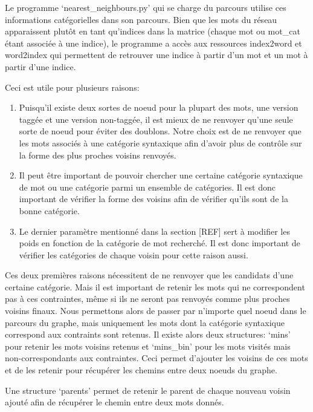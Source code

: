 Le programme \lq{nearest\_neighbours.py}\rq{} qui se charge du parcours utilise ces informations catégorielles dans son parcours. Bien que les mots du réseau apparaissent plutôt en tant qu'indices dans la matrice (chaque mot ou mot\_cat étant associée à une indice), le programme a accès aux ressources index2word et word2index qui permettent de retrouver une indice à partir d'un mot et un mot à partir d'une indice.

Ceci est utile pour plusieurs raisons:

\begin{enumerate}
    \item{Puisqu'il existe deux sortes de noeud pour la plupart des mots, une version taggée et une version non-taggée, il est mieux de ne renvoyer qu'une seule sorte de noeud pour éviter des doublons. Notre choix est de ne renvoyer que les mots associés à une catégorie syntaxique afin d'avoir plus de contrôle sur la forme des plus proches voisins renvoyés.}
    \item{Il peut être important de pouvoir chercher une certaine catégorie syntaxique de mot ou une catégorie parmi un ensemble de catégories. Il est donc important de vérifier la forme des voisins afin de vérifier qu'ils sont de la bonne catégorie.}
    \item{Le dernier paramètre mentionné dans la section [REF] sert à modifier les poids en fonction de la catégorie de mot recherché. Il est donc important de vérifier les catégories de chaque voisin pour cette raison aussi.}
\end{enumerate}

Ces deux premières raisons nécessitent de ne renvoyer que les candidats d'une certaine catégorie. Mais il est important de retenir les mots qui ne correspondent pas à ces contraintes, même si ils ne seront pas renvoyés comme plus proches voisins finaux. Nous permettons alors de passer par n'importe quel noeud dans le parcours du graphe, mais uniquement les mots dont la catégorie syntaxique correspond aux contraints sont retenus. Il existe alors deux structures: \lq{mins}\rq{} pour retenir les mots voisins retenus et \lq{mins\_bin}\rq{} pour les mots visités mais non-correspondants aux contraintes. Ceci permet d'ajouter les voisins de ces mots et de les retenir pour récupérer les chemins entre deux noeuds du graphe.

Une structure \lq{parents}\rq{} permet de retenir le parent de chaque nouveau voisin ajouté afin de récupérer le chemin entre deux mots donnés.

















